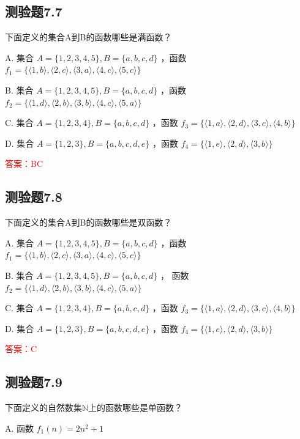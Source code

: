 \documentclass[UTF8, heading=true]{ctexart}
\begin{document}
\subsection{测验题7.7}

下面定义的集合A到B的函数哪些是满函数？

A. 集合 $A=\{1,2,3,4,5\}, B=\{a, b, c, d\}$ ，函数 $f_1=\{\langle 1, b\rangle,\langle 2, c\rangle,\langle 3, a\rangle,\langle 4, c\rangle,\langle 5, c\rangle\}$

B. 集合 $A=\{1,2,3,4,5\}, B=\{a, b, c, d\}$ ，函数 $f_2=\{\langle 1, d\rangle,\langle 2, b\rangle,\langle 3, b\rangle,\langle 4, c\rangle,\langle 5, a\rangle\}$

C. 集合 $A=\{1,2,3,4\}, B=\{a, b, c, d\}$ ，函数 $f_3=\{\langle 1, a\rangle,\langle 2, d\rangle,\langle 3, c\rangle,\langle 4, b\rangle\}$

D. 集合 $A=\{1,2,3\}, B=\{a, b, c, d, e\}$ ，函数 $f_4=\{\langle 1, e\rangle,\langle 2, d\rangle,\langle 3, b\rangle\}$


\textcolor{red}{答案：BC}

\subsection{测验题7.8}

下面定义的集合A到B的函数哪些是双函数？

A. 集合 $A=\{1,2,3,4,5\}, B=\{a, b, c, d\}$ ，函数 $f_1=\{\langle 1, b\rangle,\langle 2, c\rangle,\langle 3, a\rangle,\langle 4, c\rangle,\langle 5, c\rangle\}$ 

B. 集合 $A=\{1,2,3,4,5\}, B=\{a, b, c, d\}$ ，
函数 $f_2=\{\langle 1, d\rangle,\langle 2, b\rangle,\langle 3, b\rangle,\langle 4, c\rangle,\langle 5, a\rangle\}$ 

C. 集合 $A=\{1,2,3,4\}, B=\{a, b, c, d\}$ ，函数 $f_3=\{\langle 1, a\rangle,\langle 2, d\rangle,\langle 3, c\rangle,\langle 4, b\rangle\}$ 

D. 集合 $A=\{1,2,3\}, B=\{a, b, c, d, e\}$ ，函数 $f_4=\{\langle 1, e\rangle,\langle 2, d\rangle,\langle 3, b\rangle\}$


\textcolor{red}{答案：C}

\subsection{测验题7.9}

下面定义的自然数集$\mathbb{N}$上的函数哪些是单函数？

A. 函数 $f_1(n)=2 n^2+1$
\end{document}
